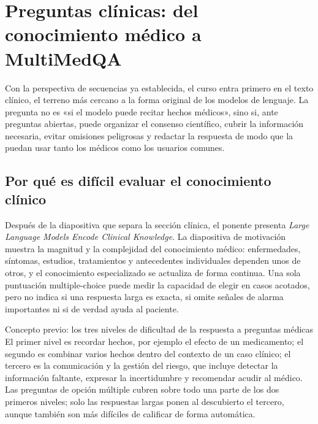 \section{Preguntas clínicas: del conocimiento médico a MultiMedQA}

Con la perspectiva de secuencias ya establecida, el curso entra primero en el texto clínico, el terreno más cercano a la forma original de los modelos de lenguaje. La pregunta no es «si el modelo puede recitar hechos médicos», sino si, ante preguntas abiertas, puede organizar el consenso científico, cubrir la información necesaria, evitar omisiones peligrosas y redactar la respuesta de modo que la puedan usar tanto los médicos como los usuarios comunes.

\subsection{Por qué es difícil evaluar el conocimiento clínico}

Después de la diapositiva que separa la sección clínica, el ponente presenta \emph{Large Language Models Encode Clinical Knowledge}. La diapositiva de motivación muestra la magnitud y la complejidad del conocimiento médico: enfermedades, síntomas, estudios, tratamientos y antecedentes individuales dependen unos de otros, y el conocimiento especializado se actualiza de forma continua. Una sola puntuación multiple-choice puede medir la capacidad de elegir en casos acotados, pero no indica si una respuesta larga es exacta, si omite señales de alarma importantes ni si de verdad ayuda al paciente.




\begin{knowledgebox}{Concepto previo: los tres niveles de dificultad de la respuesta a preguntas médicas}
El primer nivel es recordar hechos, por ejemplo el efecto de un medicamento; el segundo es combinar varios hechos dentro del contexto de un caso clínico; el tercero es la comunicación y la gestión del riesgo, que incluye detectar la información faltante, expresar la incertidumbre y recomendar acudir al médico. Las preguntas de opción múltiple cubren sobre todo una parte de los dos primeros niveles; solo las respuestas largas ponen al descubierto el tercero, aunque también son más difíciles de calificar de forma automática.
\end{knowledgebox}

